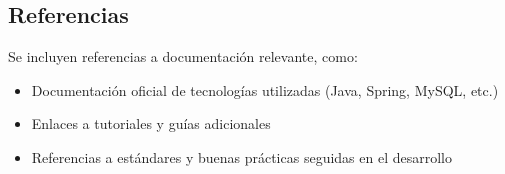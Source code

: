 \documentclass[12pt,a4paper]{article}
\begin{document}
\subsection{Referencias}

Se incluyen referencias a documentación relevante, como:

\begin{itemize}
    \item Documentación oficial de tecnologías utilizadas (Java, Spring, MySQL, etc.)
    \item Enlaces a tutoriales y guías adicionales
    \item Referencias a estándares y buenas prácticas seguidas en el desarrollo
\end{itemize}
\end{document}
